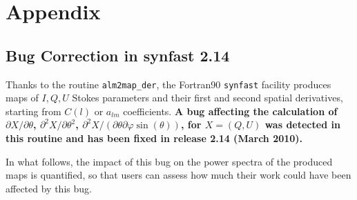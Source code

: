 \section[Appendix]{Appendix}
\label{fac:appendix}
\subsection{Bug Correction in synfast 2.14}
\label{fac:sec:bug_synder}
Thanks to the routine {\tt alm2map\_der}, the Fortran90 {\tt synfast} facility  produces
maps of $I,Q,U$ Stokes parameters and their first and second spatial derivatives,
starting from $C(l)$ or $a_{lm}$ coefficients.
{\bf A bug affecting the calculation of $\partial X/\partial\theta$, 
$\partial^2 X/\partial \theta^2$, 
$\partial^2 X/(\partial\theta\partial\varphi\sin(\theta))$, for $X=(Q,U)$
was detected in this routine and has been fixed in release 2.14 (March 2010).}

In what follows, the impact of this bug on the power spectra of
the produced maps is quantified, so that users can
assess how much their work could have been affected by this bug.

